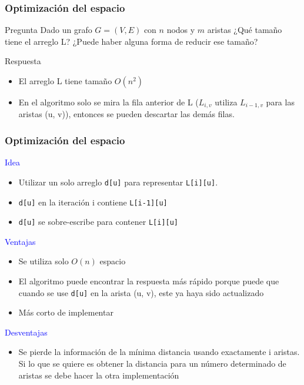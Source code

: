 \documentclass{beamer}
\begin{document}
	\begin{frame}
		\frametitle{Optimización del espacio}
		\begin{alertblock}{Pregunta}
			Dado un grafo $G = (V, E)$ con $n$ nodos y $m$ aristas ¿Qué tamaño tiene el arreglo L?
			¿Puede haber alguna forma de reducir ese tamaño?
		\end{alertblock}
		\pause
		\begin{exampleblock}{Respuesta}
			\begin{itemize}
				\item El arreglo L tiene tamaño $O(n^2)$
				\item En el algoritmo solo se mira la fila anterior de L ($L_{i,v}$ utiliza $L_{i-1,v}$ para las aristas (u, v)), entonces se pueden descartar las demás filas.
			\end{itemize}
		\end{exampleblock}
	\end{frame}
	
	\begin{frame}[fragile]
		\frametitle{Optimización del espacio}
		\textcolor{blue}{\large Idea}\\
		\begin{itemize}
			\item Utilizar un solo arreglo \verb|d[u]| para representar \verb|L[i][u]|.
			\item \verb|d[u]| en la iteración i contiene \verb|L[i-1][u]|
			\item \verb|d[u]| se sobre-escribe para contener \verb|L[i][u]|
		\end{itemize}
		\textcolor{blue}{\large Ventajas}\\
		\begin{itemize}
			\item Se utiliza solo $O(n)$ espacio
			\item El algoritmo puede encontrar la respuesta más rápido porque puede que cuando se use \verb|d[u]| en la arista (u, v), este ya haya sido actualizado
			\item Más corto de implementar
		\end{itemize}
		\textcolor{blue}{\large Desventajas}\\
		\begin{itemize}
			\item Se pierde la información de la mínima distancia usando exactamente i aristas. Si lo que se quiere es obtener la distancia para un número determinado de aristas se debe hacer la otra implementación
		\end{itemize}
	\end{frame}
	
\end{document}
